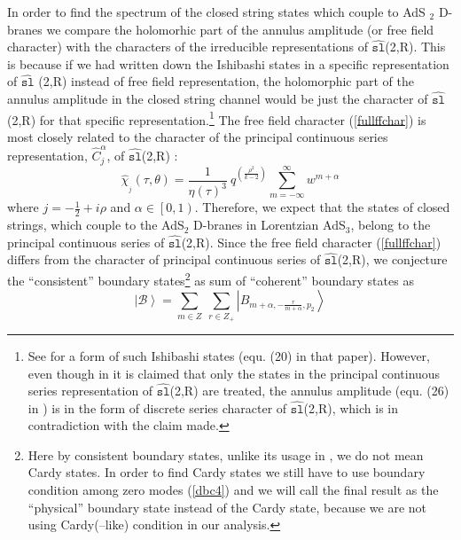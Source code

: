 \documentclass[a4paper,12pt]{article}
\begin{document}
In order to find the spectrum of the closed string states which couple to AdS%
$_{2}$ D-branes we compare the holomorhic part of the annulus amplitude (or
free field character) with the characters of the irreducible representations
of $\widehat{\mathtt{sl}}$(2,R). This is because if we had written down the
Ishibashi states in a specific representation of $\widehat{\mathtt{sl}}$%
(2,R) instead of free field representation, the holomorphic part
of the annulus amplitude in the closed string channel would be
just the character of $\widehat{\mathtt{sl}}$(2,R) for that
specific representation.\footnote{%
See \cite{rajaraman} for a form of such Ishibashi states (equ.
(20) in that paper). However, even though in \cite{rajaraman} it
is claimed that only the states in the principal continuous series
representation of $\widehat{\mathtt{sl}}$(2,R) are treated, the
annulus amplitude (equ. (26) in \cite{rajaraman}) is in the form
of discrete series character of $\widehat{\mathtt{sl}}$(2,R),
which is in contradiction with the claim made.} The free field
character (\ref{fullffchar}) is most closely related to the
character of
the principal continuous series representation, $\hat{C}_{j}^{\alpha }$, of $%
\widehat{\mathtt{sl}}$(2,R) \cite{roberts}:
\begin{equation}
\hat{\chi}_{_{j}}\left( \tau ,\theta \right) =\frac{1}{\eta \left(
\tau \right) ^{3}}\ q^{\left( \frac{\rho ^{2}}{k-2}\right)
}\sum_{m=-\infty }^{\infty }w^{m+\alpha }
\end{equation}
where $j=-\frac{1}{2}+i\rho $ and $\alpha \in \left[ 0,1\right) $.
Therefore, we expect that the states of closed strings, which couple to the
AdS$_{2}$ D-branes in Lorentzian AdS$_{3}$, belong to the principal
continuous series of $\widehat{\mathtt{sl}}$(2,R). Since the free field
character (\ref{fullffchar}) differs from the character of principal
continuous series of $\widehat{\mathtt{sl}}$(2,R), we conjecture the
``consistent'' boundary states\footnote{%
Here by consistent boundary states, unlike its usage in \cite{kawai}, we do
not mean Cardy states. In order to find Cardy states we still have to use
boundary condition among zero modes (\ref{dbc4}) and we will call the final
result as the ``physical'' boundary state instead of the Cardy state,
because we are not using Cardy(--like) condition in our analysis.} as sum of
``coherent'' boundary states as
\begin{equation}
\left| \mathcal{B}\right\rangle =\sum_{m\in Z}\ \sum_{r\in Z_{+}}\left|
B_{m+\alpha ,-\frac{r}{m+\alpha },p_{2}}\right\rangle  \label{consistent}
\end{equation}
\end{document}
